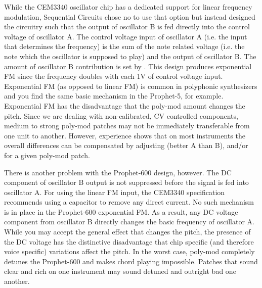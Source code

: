 \documentclass[landscape, 11pt, oneside, twoside]{report}
\newenvironment{flowtext}{\addmargin[0cm]{0cm}}{\endaddmargin} %
\begin{document}
\begin{flowtext}
While the CEM3340 oscillator chip has a dedicated support for linear frequency modulation, Sequential Circuits chose no to use that option but instead designed the circuitry such that the output of oscillator B is fed directly into the control voltage of oscillator A. The control voltage input of oscillator A (i.e. the input that determines the frequency) is the sum of the note related voltage (i.e. the note which the oscillator is supposed to play) and the output of oscillator B. The amount of oscillator B contribution is set by \polymodosc. This design produces exponential FM since the frequency doubles with each 1V of control voltage input. Exponential FM (as opposed to linear FM) is common in polyphonic synthesizers and you find the same basic mechanism in the Prophet-5, for example. Exponential FM has the disadvantage that the poly-mod amount changes the pitch. Since we are dealing with non-calibrated, CV controlled components, medium to strong poly-mod patches may not be immediately transferable from one unit to another. However, experience shows that on most instruments the overall differences can be compensated by adjusting \oscfreq (better A than B), \freqfine and/or \polymodosc for a given poly-mod patch.

There is another problem with the Prophet-600 design, however. The DC component of oscillator B output is not suppressed before the signal is fed into oscillator A. For using the linear FM input, the CEM3340 specification recommends using a capacitor to remove any direct current. No such mechanism is in place in the Prophet-600 exponential FM. As a result, any DC voltage component from oscillator B directly changes the basic frequency of oscillator A. While you may accept the general effect that \polymodosc changes the pitch, the presence of the DC voltage has the distinctive disadvantage that chip specific (and therefore voice specific) variations affect the pitch. In the worst case, poly-mod completely detunes the Prophet-600 and makes chord playing impossible. Patches that sound clear and rich on one instrument may sound detuned and outright bad one another. 


\end{flowtext}
\end{document}
